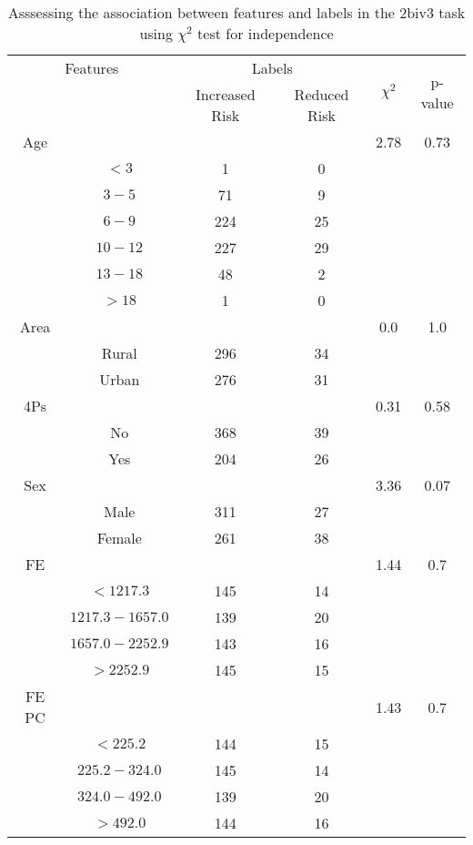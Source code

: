 \begin{table}[!htb]
\centering
\caption{Asssessing the association between features and labels in the 2biv3 task using $\chi^2$ test for independence}
\label{tab:chitest_2biv3}
\begin{tabular}{c c | c c| c | c}
\hline
\multicolumn{2}{c|}{Features}& \multicolumn{2}{c|}{Labels}& \multirow{2}{*}{$\chi^2$} & \multirow{2}{*}{p-value}\\ 
& & Increased Risk & Reduced Risk & & \\ 
\hline
Age &  &  & & 2.78 & 0.73 \\ 
& $< 3$ & 1 & 0& & \\ 
& $3-5$ & 71 & 9& & \\ 
& $6-9$ & 224 & 25& & \\ 
& $10-12$ & 227 & 29& & \\ 
& $13-18$ & 48 & 2& & \\ 
& $> 18$ & 1 & 0& & \\ 
\hline 
Area &  &  & & 0.0 & 1.0 \\ 
& Rural & 296 & 34& & \\ 
& Urban & 276 & 31& & \\ 
\hline 
4Ps &  &  & & 0.31 & 0.58 \\ 
& No & 368 & 39& & \\ 
& Yes & 204 & 26& & \\ 
\hline 
Sex &  &  & & 3.36 & 0.07 \\ 
& Male & 311 & 27& & \\ 
& Female & 261 & 38& & \\ 
\hline 
FE &  &  & & 1.44 & 0.7 \\ 
& $< 1217.3$ & 145 & 14& & \\ 
& $1217.3-1657.0$ & 139 & 20& & \\ 
& $1657.0-2252.9$ & 143 & 16& & \\ 
& $> 2252.9$ & 145 & 15& & \\ 
\hline 
FE PC &  &  & & 1.43 & 0.7 \\ 
& $< 225.2$ & 144 & 15& & \\ 
& $225.2-324.0$ & 145 & 14& & \\ 
& $324.0-492.0$ & 139 & 20& & \\ 
& $> 492.0$ & 144 & 16& & \\ 
\hline 
\end{tabular}
\end{table}
